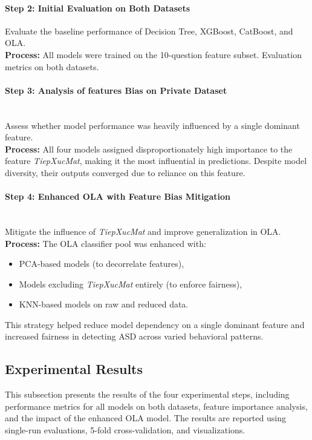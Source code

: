 \documentclass[conference]{IEEEtran}
\begin{document}
\paragraph{\textbf{Step 2: Initial Evaluation on Both Datasets}}

Evaluate the baseline performance of Decision Tree, XGBoost, CatBoost, and OLA.\\
\textbf{Process:} All models were trained on the 10-question feature subset. Evaluation metrics on both datasets.

\paragraph{\textbf{Step 3: Analysis of features Bias on Private Dataset}}\\

Assess whether model performance was heavily influenced by a single dominant feature.\\
\textbf{Process:} All four models assigned disproportionately high importance to the feature \textit{TiepXucMat}, making it the most influential in predictions. Despite model diversity, their outputs converged due to reliance on this feature.

\paragraph{\textbf{Step 4: Enhanced OLA with Feature Bias Mitigation}}\\

Mitigate the influence of \textit{TiepXucMat} and improve generalization in OLA.\\
\textbf{Process:} The OLA classifier pool was enhanced with:
\begin{itemize}
\item PCA-based models (to decorrelate features),
\item Models excluding \textit{TiepXucMat} entirely (to enforce fairness),
\item KNN-based models on raw and reduced data.
\end{itemize}
This strategy helped reduce model dependency on a single dominant feature and increased fairness in detecting ASD across varied behavioral patterns.
\subsection{Experimental Results}
This subsection presents the results of the four experimental steps, including performance metrics for all models on both datasets, feature importance analysis, and the impact of the enhanced OLA model. The results are reported using single-run evaluations, 5-fold cross-validation, and visualizations.
\end{document}
